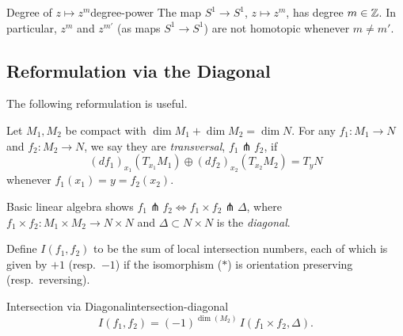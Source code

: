 \begin{center}
\end{center}

\begin{example}{Degree of $z \mapsto z^m$}{degree-power}
    The map $S^1 \to S^1$, $z \mapsto z^m$, has degree $m \in \mathbb{Z}$. In particular, $z^m$ and $z^{m'}$ (as maps $S^1 \to S^1$) are not homotopic whenever $m \neq m'$.
\end{example}

\subsection{Reformulation via the Diagonal}

The following reformulation is useful.

Let $M_1, M_2$ be compact with $\dim M_1 + \dim M_2 = \dim N$. For any $f_1 \colon M_1 \to N$ and $f_2 \colon M_2 \to N$, we say they are \emph{transversal}, $f_1 \pitchfork f_2$, if
\begin{equation}
    (df_1)_{x_1}(T_{x_1} M_1) \oplus (df_2)_{x_2}(T_{x_2} M_2) = T_y N \tag{$*$}
\end{equation}
whenever $f_1(x_1) = y = f_2(x_2)$.

Basic linear algebra shows $f_1 \pitchfork f_2 \iff f_1 \times f_2 \pitchfork \Delta$, where $f_1 \times f_2 \colon M_1 \times M_2 \to N \times N$ and $\Delta \subset N \times N$ is the \emph{diagonal}.

Define $I(f_1, f_2)$ to be the sum of local intersection numbers, each of which is given by $+1$ (resp.\ $-1$) if the isomorphism ($*$) is orientation preserving (resp.\ reversing).

\begin{proposition}{Intersection via Diagonal}{intersection-diagonal}
    \[
        I(f_1, f_2) = (-1)^{\dim(M_2)} \, I(f_1 \times f_2, \Delta).
    \]
\end{proposition}

